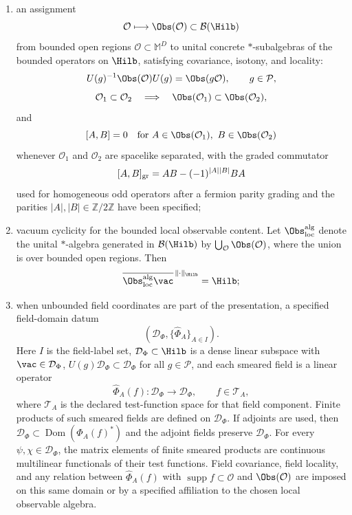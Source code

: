 \begin{definition}
\begin{enumerate}
  \[
    E_P(\{0\})\Hilb
    =
    \mathbb C\vac;
  \]
  \item an assignment
  \[
    \mathcal O\longmapsto\Obs(\mathcal O)\subset\mathcal B(\Hilb)
  \]
  from bounded open regions \(\mathcal O\subset\mathbb M^D\) to unital
  concrete \(*\)-subalgebras of the bounded operators on \(\Hilb\), satisfying
  covariance, isotony, and locality:
  \[
    U(g)^{-1}\Obs(\mathcal O)U(g)
    =
    \Obs(g\mathcal O),
    \qquad g\in\mathcal P,
  \]
  \[
    \mathcal O_1\subset\mathcal O_2
    \quad\Longrightarrow\quad
    \Obs(\mathcal O_1)\subset\Obs(\mathcal O_2),
  \]
  and
  \[
    [A,B]=0
    \quad
    \text{for }A\in\Obs(\mathcal O_1),\ B\in\Obs(\mathcal O_2)
  \]
  whenever \(\mathcal O_1\) and \(\mathcal O_2\) are spacelike separated, with
  the graded commutator
  \[
    [A,B]_{\rm gr}=AB-(-1)^{|A||B|}BA
  \]
  used for homogeneous odd operators after a fermion parity grading and the
  parities \(|A|,|B|\in\mathbb Z/2\mathbb Z\) have been specified;
  \item vacuum cyclicity for the bounded local observable content.  Let
  \(\Obs_{\rm loc}^{\rm alg}\) denote the unital \(*\)-algebra generated in
  \(\mathcal B(\Hilb)\) by \(\bigcup_{\mathcal O}\Obs(\mathcal O)\), where the
  union is over bounded open regions.  Then
  \[
    \overline{\Obs_{\rm loc}^{\rm alg}\vac}^{\,\|\cdot\|_{\Hilb}}
    =
    \Hilb;
  \]
  \item when unbounded field coordinates are part of the presentation, a
  specified field-domain datum
  \[
    (\mathcal D_\Phi,\{\widehat\Phi_A\}_{A\in I}).
  \]
  Here \(I\) is the field-label set, \(\mathcal D_\Phi\subset\Hilb\) is a dense
  linear subspace with \(\vac\in\mathcal D_\Phi\), \(U(g)\mathcal D_\Phi\subset
  \mathcal D_\Phi\) for all \(g\in\mathcal P\), and each smeared field is a
  linear operator
  \[
    \widehat\Phi_A(f):\mathcal D_\Phi\to\mathcal D_\Phi,
    \qquad f\in\mathcal T_A,
  \]
  where \(\mathcal T_A\) is the declared test-function space for that field
  component.  Finite products of such smeared fields are defined on
  \(\mathcal D_\Phi\).  If adjoints are used, then
  \(\mathcal D_\Phi\subset\operatorname{Dom}(\widehat\Phi_A(f)^*)\) and the adjoint
  fields preserve \(\mathcal D_\Phi\).  For every
  \(\psi,\chi\in\mathcal D_\Phi\), the matrix elements of finite smeared
  products are continuous multilinear functionals of their test functions.
  Field covariance, field locality, and any relation between
  \(\widehat\Phi_A(f)\) with \(\operatorname{supp}f\subset\mathcal O\) and
  \(\Obs(\mathcal O)\) are imposed on this same domain or by a specified
  affiliation to the chosen local observable algebra.
\end{enumerate}
\end{definition}

